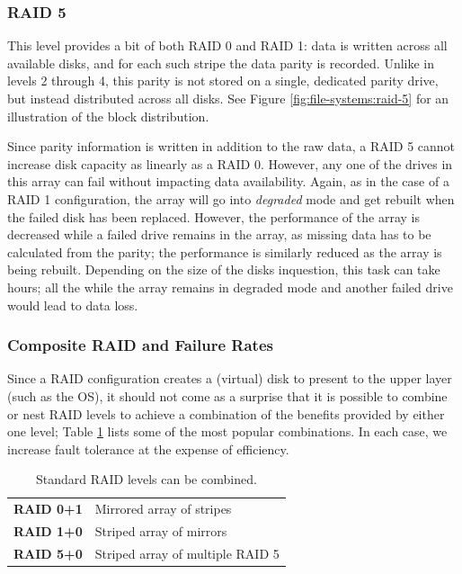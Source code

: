 \subsubsection{RAID 5}

This level provides a bit of both RAID 0 and RAID 1:
data is written across all available disks, and for
each such stripe the data parity is recorded.  Unlike
in levels 2 through 4, this parity is not stored on a
single, dedicated parity drive, but instead
distributed across all disks.  See Figure
\ref{fig:file-systems:raid-5} for an illustration of
the block distribution.

Since parity information is written in addition to the
raw data, a RAID 5 cannot increase disk capacity as
linearly as a RAID 0.  However, any one of the drives
in this array can fail without impacting data
availability.  Again, as in the case of a RAID 1
configuration, the array will go into {\em degraded}
mode and get rebuilt when the failed disk has been
replaced.  However, the performance of the array is
decreased while a failed drive remains in the array,
as missing data has to be calculated from the parity;
the performance is similarly reduced as the array is
being rebuilt. Depending on the size of the disks
inquestion, this task can take hours; all the while
the array remains in degraded mode and another failed
drive would lead to data loss.

\subsubsection{Composite RAID and Failure Rates}

Since a RAID configuration creates a (virtual) disk to
present to the upper layer (such as the OS), it should
not come as a surprise that it is possible to combine
or nest RAID levels to achieve a combination of the
benefits provided by either one level; Table
\ref{table:file systems:raid-nested} lists some of the
most popular combinations.  In each case, we increase
fault tolerance at the expense of efficiency.

\begin{table}[b]
\centering
	\begin{tabular}{ l p{}}
	\hline
	{\bf RAID 0+1} & Mirrored array of stripes \\
	{\bf RAID 1+0} & Striped array of mirrors \\
	{\bf RAID 5+0} & Striped array of multiple RAID 5 \\
	\hline
	\end{tabular}
	\caption{Standard RAID levels can be combined.}
	\label{table:file systems:raid-nested}
\end{table}

